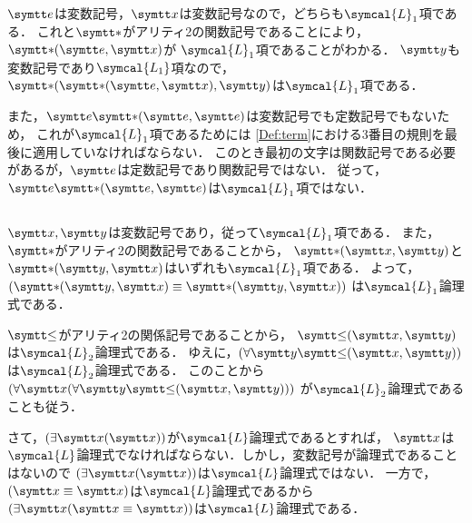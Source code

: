 \section*{}

\subsection*{}

\(\obj{e}\)は変数記号，\(\obj{x}\)は変数記号なので，どちらも\(\symcal{L}_1\)項である．
これと\(\obj{\ast}\)がアリティ2の関数記号であることにより，\(\apply{\obj{\ast}}{\obj{e}, \obj{x}}\)が
\(\symcal{L}_1\)項であることがわかる．
\(\obj{y}\)も変数記号であり\(\symcal{L_1}\)項なので，
\(\apply{\obj{\ast}}{\apply{\obj{\ast}}{\obj{e}, \obj{x}}, \obj{y}}\)は\(\symcal{L}_1\)項である．

また，\(\obj{e}\apply{\mathord{\obj{\ast}}}{\obj{e}, \obj{e}}\)は変数記号でも定数記号でもないため，
これが\(\symcal{L}_1\)項であるためには
\cref{Def:term}における3番目の規則を最後に適用していなければならない．
このとき最初の文字は関数記号である必要があるが，\(\obj{e}\)は定数記号であり関数記号ではない．
従って，\(\obj{e}\apply{\mathord{\obj{\ast}}}{\obj{e}, \obj{e}}\)は\(\symcal{L}_1\)項ではない．

\subsection*{}

\(\obj{x}, \obj{y}\)は変数記号であり，従って\(\symcal{L}_1\)項である．
また，\(\obj{\ast}\)がアリティ2の関数記号であることから，
\(\apply{\mathord{\obj{\ast}}}{\obj{x}, \obj{y}}\)と
\(\apply{\mathord{\obj{\ast}}}{\obj{y}, \obj{x}}\)はいずれも\(\symcal{L}_1\)項である．
よって，
\(\paren{\apply{\mathord{\obj{\ast}}}{\obj{y}, \obj{x}} \objeq \apply{\mathord{\obj{\ast}}}{\obj{y}, \obj{x}}}\)
は\(\symcal{L}_1\)論理式である．

\(\obj{\leq}\)がアリティ2の関係記号であることから，
\(\apply{\mathord{\obj{\leq}}}{\obj{x}, \obj{y}}\)は\(\symcal{L}_2\)論理式である．
ゆえに，\(\paren{\forall \obj{y}\apply{\mathord{\obj{\leq}}}{\obj{x}, \obj{y}}}\)
は\(\symcal{L}_2\)論理式である．
このことから\(\paren{\forall \obj{x}\paren{\forall \obj{y}\apply{\mathord{\obj{\leq}}}{\obj{x}, \obj{y}}}}\)
が\(\symcal{L}_2\)論理式であることも従う．

さて，\(\paren{\apply{\exists \obj{x}}{\obj{x}}}\)が\(\symcal{L}\)論理式であるとすれば，
\(\obj{x}\)は\(\symcal{L}\)論理式でなければならない．しかし，変数記号が論理式であることはないので
\(\paren{\apply{\exists \obj{x}}{\obj{x}}}\)は\(\symcal{L}\)論理式ではない．
一方で，\(\paren{\obj{x} \objeq \obj{x}}\)は\(\symcal{L}\)論理式であるから
\(\paren{\apply{\exists \obj{x}}{\obj{x} \objeq \obj{x}}}\)は\(\symcal{L}\)論理式である．

